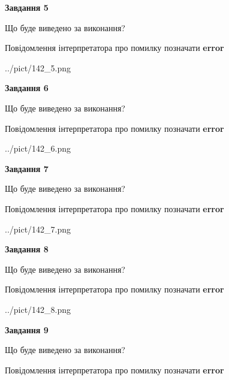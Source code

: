 \documentclass[11pt, ukrainian]{article}
\begin{document}
{\begin {large}
{\begin {center}\textbf{Завдання 5}\end {center}}\par
Що буде виведено за виконання? \par
Повідомлення інтерпретатора про помилку позначати \textbf{error}

\begin{center}
	{../pict/142_5.png}
\end{center}
\newpage

{\begin {center}\textbf{Завдання 6}\end {center}}\par
Що буде виведено за виконання? \par
Повідомлення інтерпретатора про помилку позначати \textbf{error}

\begin{center}
	{../pict/142_6.png}
\end{center}
\newpage

{\begin {center}\textbf{Завдання 7}\end {center}}\par
Що буде виведено за виконання? \par
Повідомлення інтерпретатора про помилку позначати \textbf{error}

\begin{center}
	{../pict/142_7.png}
\end{center}
\newpage

{\begin {center}\textbf{Завдання 8}\end {center}}\par
Що буде виведено за виконання? \par
Повідомлення інтерпретатора про помилку позначати \textbf{error}

\begin{center}
	{../pict/142_8.png}
\end{center}
\newpage

{\begin {center}\textbf{Завдання 9}\end {center}}\par
Що буде виведено за виконання? \par
Повідомлення інтерпретатора про помилку позначати \textbf{error}


\end{large}}
\end{document}
